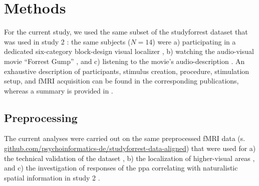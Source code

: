 \section{Methods}



For the current study, we used the same subset of the studyforrest dataset that
was used in study 2 \citep{haeusler2022processing}:
%
the same subjects ($N=14$) were
a) participating in a dedicated six-category block-design visual localizer
\citep{sengupta2016extension},
b) watching the audio-visual movie ``Forrest Gump''
\citep{hanke2016simultaneous}, and
c) listening to the movie's audio-description \citep{hanke2014audiomovie}.
An exhaustive description of participants, stimulus creation, procedure,
stimulation setup, and fMRI acquisition can be found in the corresponding
publications, whereas a summary is provided in \citet{haeusler2022processing}.



\subsection{Preprocessing}

The current analyses were carried out on the same preprocessed fMRI data (s.
\href{https://github.com/psychoinformatics-de/studyforrest-data-aligned
}{\url{github.com/psychoinformatics-de/studyforrest-data-aligned}}) that were
used for
%
a) the technical validation of the dataset \citep{hanke2016simultaneous},
%
b) the localization of higher-visual areas \citep{sengupta2016extension}, and
%
c) the investigation of responses of the \ac{ppa} correlating with naturalistic
spatial information in study 2 \citep{haeusler2022processing}.

